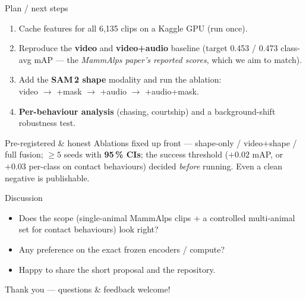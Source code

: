 \documentclass[aspectratio=169,11pt]{beamer}
\begin{document}
\begin{frame}{Plan / next steps}
  \begin{enumerate}
    \item Cache features for all 6{,}135 clips on a Kaggle GPU (run once).
    \item Reproduce the \textbf{video} and \textbf{video+audio} baseline
          (target 0.453 / 0.473 class-avg mAP --- the \emph{MammAlps paper's reported
          scores}, which we aim to match).
    \item Add the \textbf{SAM\,2 shape} modality and run the ablation:\\
          video $\rightarrow$ +mask $\rightarrow$ +audio $\rightarrow$ +audio+mask.
    \item \textbf{Per-behaviour analysis} (chasing, courtship) and a background-shift
          robustness test.
  \end{enumerate}
  \vfill
  \begin{block}{Pre-registered \& honest}
    Ablations fixed up front --- shape-only / video+shape / full fusion; $\geq 5$ seeds with
    \textbf{95\,\% CIs}; the success threshold ($+0.02$ mAP, or $+0.03$ per-class on contact
    behaviours) decided \emph{before} running. Even a clean negative is publishable.
  \end{block}
\end{frame}

\begin{frame}{Discussion}
  \begin{itemize}
    \item Does the scope (single-animal MammAlps clips + a controlled multi-animal set for
          contact behaviours) look right?
    \item Any preference on the exact frozen encoders / compute?
    \item Happy to share the short proposal and the repository.
  \end{itemize}
  \vfill
  \begin{center}
    \Large Thank you --- questions \& feedback welcome!
  \end{center}
\end{frame}
\end{document}
